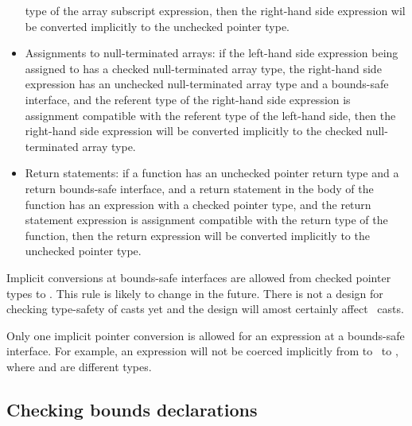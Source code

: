 \begin{itemize}
  type of the array subscript expression, then the right-hand side expression
  wil be converted implicitly to the unchecked pointer type.
\item Assignments to null-terminated arrays: if the left-hand side expression
  being assigned to has a checked null-terminated array type, the right-hand side
  expression has an unchecked null-terminated array type and a bounds-safe interface,
  and the referent type of the right-hand side expression is assignment compatible
  with the referent type of the left-hand side, then the right-hand side expression
  will be converted implicitly to the checked null-terminated array type.
\item Return statements: if a function has an unchecked pointer return type and a
  return bounds-safe interface, and a return statement in the body of the function
  has an expression with a checked pointer type, and the return statement expression is
  assignment compatible with the return type of the function, then the return expression
  will be converted implicitly to the unchecked pointer type.
\end{itemize}

Implicit conversions at bounds-safe interfaces are allowed from checked pointer types to
\uncheckedptrvoid.  This rule is likely to change in the future.  There is not a  design for
checking type-safety of casts yet and the design will amost certainly affect 
\uncheckedptrvoid\ casts.

Only one implicit pointer conversion is allowed for an expression at a bounds-safe
interface.  For example, an expression will not be
coerced implicitly from  to \uncheckedptrvoid\ to
, where  and  are different types.

\subsection{Checking bounds declarations}
\label{section:checking-bounds-interfaces}

